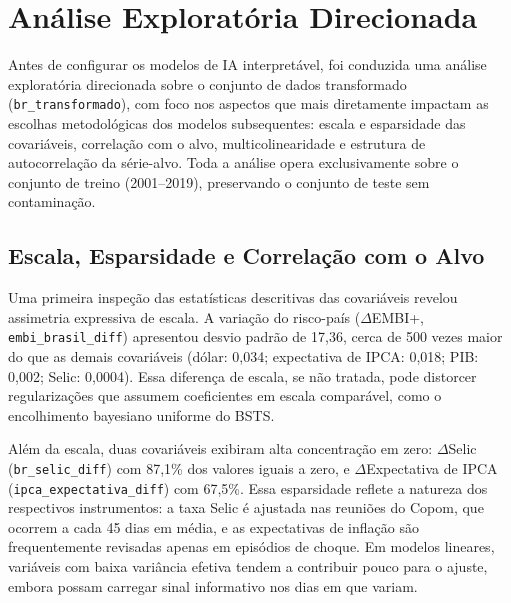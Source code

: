 \documentclass[	12pt, Times, openright, oneside, a4paper, english, brazil]{abntex2}
\begin{document}

\section{Análise Exploratória Direcionada}\label{sec:eda_tcc2}

Antes de configurar os modelos de IA interpretável, foi conduzida uma análise exploratória direcionada sobre o conjunto de dados transformado (\texttt{br\_transformado}), com foco nos aspectos que mais diretamente impactam as escolhas metodológicas dos modelos subsequentes: escala e esparsidade das covariáveis, correlação com o alvo, multicolinearidade e estrutura de autocorrelação da série-alvo. Toda a análise opera exclusivamente sobre o conjunto de treino (2001--2019), preservando o conjunto de teste sem contaminação.

\subsection{Escala, Esparsidade e Correlação com o Alvo}

Uma primeira inspeção das estatísticas descritivas das covariáveis revelou assimetria expressiva de escala. A variação do risco-país ($\Delta$EMBI+, \texttt{embi\_brasil\_diff}) apresentou desvio padrão de 17,36, cerca de 500 vezes maior do que as demais covariáveis (dólar: 0,034; expectativa de IPCA: 0,018; PIB: 0,002; Selic: 0,0004). Essa diferença de escala, se não tratada, pode distorcer regularizações que assumem coeficientes em escala comparável, como o encolhimento bayesiano uniforme do BSTS.

\begin{sloppypar}
Além da escala, duas covariáveis exibiram alta concentração em zero: $\Delta$Selic (\texttt{br\_selic\_diff}) com 87,1\% dos valores iguais a zero, e $\Delta$Expectativa de IPCA (\texttt{ipca\_expectativa\_diff}) com 67,5\%. Essa esparsidade reflete a natureza dos respectivos instrumentos: a taxa Selic é ajustada nas reuniões do Copom, que ocorrem a cada 45 dias em média, e as expectativas de inflação são frequentemente revisadas apenas em episódios de choque. Em modelos lineares, variáveis com baixa variância efetiva tendem a contribuir pouco para o ajuste, embora possam carregar sinal informativo nos dias em que variam.
\end{sloppypar}
\end{document}
